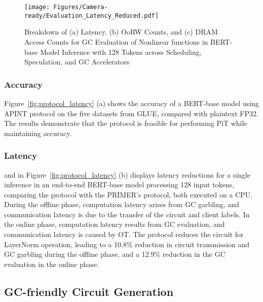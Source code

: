 \begin{figure*}[t]
    \vspace{-0.2in}
    \centering
    \texttt{[image: Figures/Camera-ready/Evaluation\_Latency\_Reduced.pdf]}
    \caption{Breakdown of (a) Latency, (b) OoRW Counts, and (c) DRAM Access Counts for GC Evaluation of Nonlinear functions in BERT-base Model Inference
with 128 Tokens across Scheduling, Speculation, and GC Accelerators}
    \label{fig:total_eval}
\end{figure*}


\subsubsection{\textbf{Accuracy}}
Figure~\ref{fig:protocol_latency} (a) shows the accuracy of a BERT-base model using APINT protocol on the five datasets from GLUE, compared with plaintext FP32. The results demonstrate that the \sysname protocol is feasible for performing PiT while maintaining accuracy.

\subsubsection{\textbf{Latency}}
 and  in Figure~\ref{fig:protocol_latency} (b) displays latency reductions for a single inference in an end-to-end BERT-base model processing 128 input tokens, comparing the \sysname protocol with the PRIMER's protocol, both executed on a CPU. During the offline phase, computation latency arises from GC garbling, and communication latency is due to the transfer of the circuit and client labels. In the online phase, computation latency results from GC evaluation, and communication latency is caused by OT. The \sysname protocol reduces the circuit for LayerNorm operation, leading to a 10.8\% reduction in circuit transmission and GC garbling during the offline phase, and a 12.9\% reduction in the GC evaluation in the online phase.



\subsection{GC-friendly Circuit Generation}

